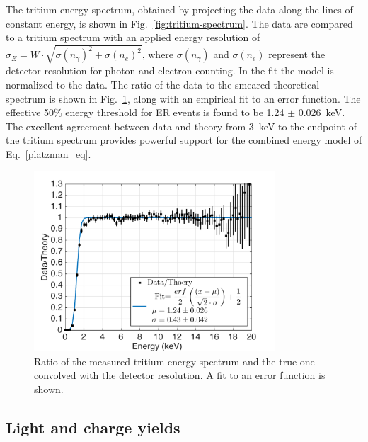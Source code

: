 The tritium energy spectrum, obtained by projecting the data along the lines of constant energy, is shown in Fig.~\ref{fig:tritium-spectrum}. The data are compared to a tritium spectrum with an applied energy resolution of $ \sigma_E = W \cdot \sqrt{\sigma(n_{\gamma})^2 + \sigma(n_e)^2}$, where $ \sigma(n_{\gamma})$ and $ \sigma(n_e)$ represent the detector resolution for photon and electron counting. In the fit the model is normalized to the data. The ratio of the data to the smeared theoretical spectrum is shown in Fig.~\ref{fig:ER-threshold}, along with an empirical fit to an error function. The effective 50\% energy threshold for ER events is found to be 1.24 $\pm$ 0.026~keV. The excellent agreement between data and theory from 3~keV to the endpoint of the tritium spectrum provides powerful support for the combined energy model of Eq.~\ref{platzman_eq}. 


\begin{figure}[t!]
\includegraphics[width=90mm]{fig6.pdf}
\caption{Ratio of the measured tritium energy spectrum and the true one convolved with the detector resolution. A fit to an error function is shown.}
\label{fig:ER-threshold}
\end{figure}

\subsection{Light and charge yields}


